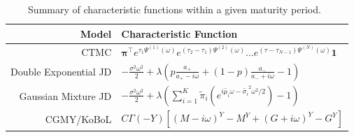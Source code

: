 \documentclass[onefignum,onetabnum]{siamonline190516}
\begin{document}





\begin{table}
\footnotesize
\renewcommand\arraystretch{1.1}
\centering
\begin{tabular}{rl}
 \toprule
 \toprule
 Model & Characteristic Function\\
 \midrule
 CTMC   & ${\boldsymbol{\pi}}^\intercal e^{\tau_1 \Psi^{(1)}(\omega)} e^{(\tau_{2} - \tau_{1}) \Psi^{(2)}(\omega)} \dots e^{(\tau - \tau_{N-1}) \Psi^{(N)}(\omega)} \boldsymbol{1}$
 \\
 Double Exponential JD& $-\frac{\sigma^2\omega^2}{2}+\lambda\left(p\frac{a_+}{a_+-i\omega} + (1-p)\frac{a_-}{a_-+i\omega}-1\right)$\\
 Gaussian Mixture JD& $-\frac{\sigma^2\omega^2}{2}+\lambda\left(\sum_{i=1}^{K}\tilde{\pi}_i(e^{i\tilde{\mu_i}\omega-\tilde{\sigma_i}^2\omega^2/2})-1\right)$ \\
 CGMY/KoBoL & $C\Gamma(-Y)[(M-i\omega)^Y-M^Y+(G+i\omega)^Y-G^Y]$ \\
 \toprule
 \toprule
\end{tabular}
\vspace*{-1em}
\caption{Summary of characteristic functions within a given maturity period.\label{tab: char}
~\vspace*{-2em}}
\end{table}
\end{document}
